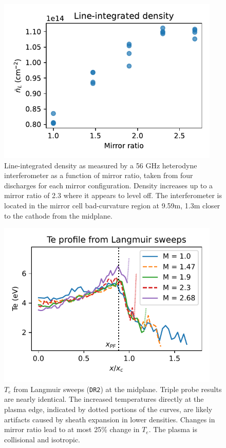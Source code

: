 \begin{figure}
    \centering
    \includegraphics[width=300pt]{figures/fig4.pdf}
    \caption{Line-integrated density as measured by a 56 GHz heterodyne interferometer as a function of mirror ratio, taken from four discharges for each mirror configuration. Density increases up to a mirror ratio of 2.3 where it appears to level off. The interferometer is located in the mirror cell bad-curvature region at 9.59m, 1.3m closer to the cathode from the midplane.}
    \label{fig:density-line}
\end{figure}

\begin{figure}
    \centering
    \includegraphics[width=300pt]{figures/fig5.pdf}
    \caption{$T_e$ from Langmuir sweeps (\texttt{DR2}) at the midplane. Triple probe results are nearly identical. The increased temperatures directly at the plasma edge, indicated by dotted portions of the curves, are likely artifacts caused by sheath expansion in lower densities. Changes in mirror ratio lead to at most 25\% change in $T_e$. The plasma is collisional and isotropic.}
    \label{fig:Te-sweeps}
\end{figure}

